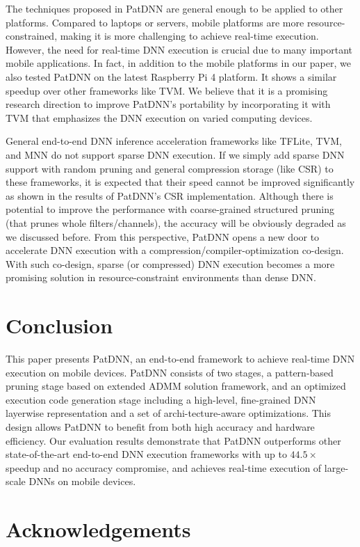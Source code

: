 \documentclass[sigplan,screen]{acmart}
\begin{document}
 The techniques proposed in PatDNN are general enough to be applied to other platforms. Compared to laptops or servers, mobile platforms are more resource-constrained, making it is more challenging to achieve real-time execution.  However, the need for real-time DNN execution
is crucial due to many important mobile applications.
In fact, in addition to the mobile platforms in our paper, we also tested PatDNN on the latest Raspberry Pi 4 platform. It shows a similar speedup over other frameworks like TVM. We believe that it is a promising research direction to improve PatDNN's portability by incorporating it with TVM that emphasizes the DNN execution on varied computing devices. 


General end-to-end DNN inference acceleration frameworks like TFLite, TVM, and MNN do not support sparse DNN execution. If we simply add sparse DNN support with random pruning and general compression storage (like CSR) to these frameworks, it is expected that their speed cannot be improved significantly as shown in 
the results of PatDNN's CSR implementation. Although there is potential to improve the performance with coarse-grained structured pruning (that prunes whole filters/channels), the accuracy will be obviously degraded as we discussed before. From this perspective, PatDNN opens a new door to accelerate DNN execution with a compression/compiler-optimization co-design. With such co-design, sparse (or compressed) DNN execution becomes a more promising solution in resource-constraint environments than dense DNN.



\section{Conclusion}\label{sec:conclusion}

This paper presents PatDNN, an end-to-end framework to achieve real-time DNN execution on mobile devices. PatDNN consists of two stages, a pattern-based pruning stage based on extended ADMM solution framework, and an optimized execution code generation stage including a high-level, fine-grained DNN layerwise representation and a set of archi-tecture-aware optimizations.
This design allows PatDNN to benefit from both high accuracy and hardware efficiency. Our evaluation results demonstrate that PatDNN outperforms other state-of-the-art end-to-end DNN execution frameworks
with up to $44.5\times$ speedup and no accuracy compromise, and achieves real-time execution of large-scale DNNs on mobile devices.   \section*{Acknowledgements}
\end{document}
